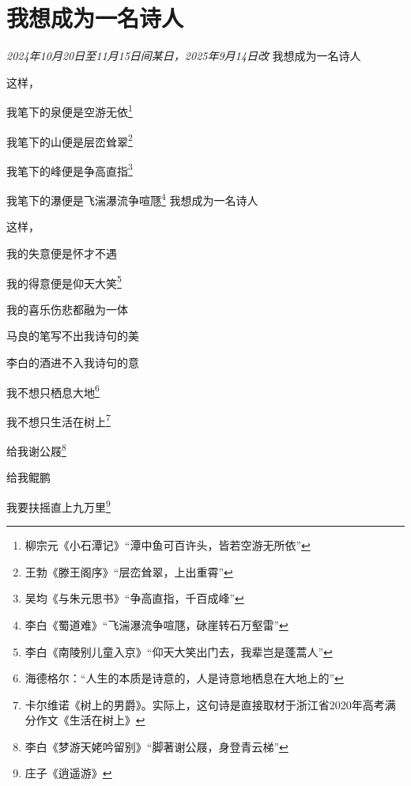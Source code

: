 \section*{我想成为一名诗人}
\begin{center}
\textit{2024年10月20日至11月15日间某日，2025年9月14日改}\hh 
我想成为一名诗人\par
这样，\par
我笔下的泉便是空游无依\footnote{柳宗元《小石潭记》“潭中鱼可百许头，皆若空游无所依”}\par
我笔下的山便是层峦耸翠\footnote{王勃《滕王阁序》“层峦耸翠，上出重霄”}\par
我笔下的峰便是争高直指\footnote{吴均《与朱元思书》“争高直指，千百成峰”}\par
我笔下的瀑便是飞湍瀑流争喧豗\footnote{李白《蜀道难》“飞湍瀑流争喧豗，砯崖转石万壑雷”}\hh
我想成为一名诗人\par
这样，\par
我的失意便是怀才不遇\par
我的得意便是仰天大笑\footnote{李白《南陵别儿童入京》“仰天大笑出门去，我辈岂是蓬蒿人”}\par
我的喜乐伤悲都融为一体\par
马良的笔写不出我诗句的美\par
李白的酒进不入我诗句的意\par
\vspace{2ex}
我不想只栖息大地\footnote{海德格尔：“人生的本质是诗意的，人是诗意地栖息在大地上的”}

我不想只生活在树上\footnote{卡尔维诺《树上的男爵》。实际上，这句诗是直接取材于浙江省2020年高考满分作文《生活在树上》}

给我谢公屐\footnote{李白《梦游天姥吟留别》“脚著谢公屐，身登青云梯”}

给我鲲鹏

我要扶摇直上九万里\footnote{庄子《逍遥游》}
\end{center}